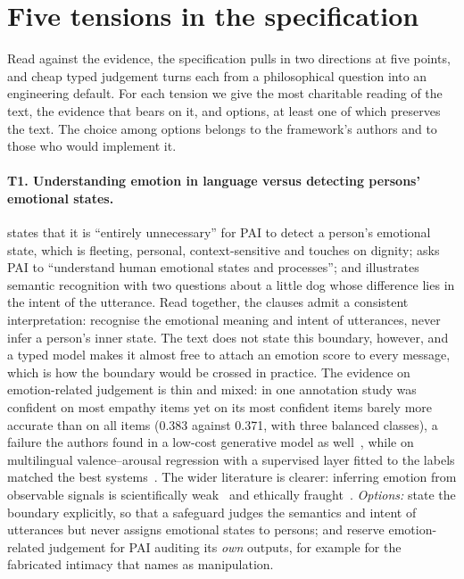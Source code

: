 \section{Five tensions in the specification}
\label{sec:synthesis}

Read against the evidence, the specification pulls in two directions at five points, and cheap typed judgement turns each from a philosophical question into an engineering default.
For each tension we give the most charitable reading of the text, the evidence that bears on it, and options, at least one of which preserves the text.
The choice among options belongs to the framework's authors and to those who would implement it.

\paragraph{T1. Understanding emotion in language versus detecting persons' emotional states.}
 states that it is ``entirely unnecessary'' for PAI to detect a person's emotional state, which is fleeting, personal, context-sensitive and touches on dignity;  asks PAI to ``understand human emotional states and processes''; and  illustrates semantic recognition with two questions about a little dog whose difference lies in the intent of the utterance.
Read together, the clauses admit a consistent interpretation: recognise the emotional meaning and intent of utterances, never infer a person's inner state.
The text does not state this boundary, however, and a typed model makes it almost free to attach an emotion score to every message, which is how the boundary would be crossed in practice.
The evidence on emotion-related judgement is thin and mixed: in one annotation study \jev{} was confident on most empathy items yet on its most confident items barely more accurate than on all items (0.383 against 0.371, with three balanced classes), a failure the authors found in a low-cost generative model as well~\cite{arx24574}, while on multilingual valence--arousal regression \jev{} with a supervised layer fitted to the labels matched the best systems~\cite{arx35293}.
The wider literature is clearer: inferring emotion from observable signals is scientifically weak~\cite{barrett2019emotional} and ethically fraught~\cite{stark2021ethics}.
\emph{Options:} state the boundary explicitly, so that a safeguard judges the semantics and intent of utterances but never assigns emotional states to persons; and reserve emotion-related judgement for PAI auditing its \emph{own} outputs, for example for the fabricated intimacy that  names as manipulation.

